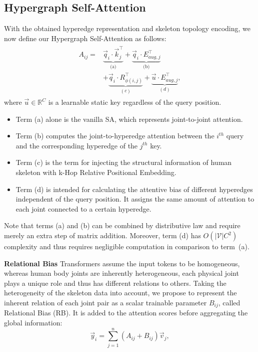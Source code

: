 \documentclass[10pt,twocolumn,letterpaper]{article}
\begin{document}
\subsection{Hypergraph Self-Attention}
With the obtained hyperedge representation and skeleton topology encoding, we now define our Hypergraph Self-Attention as follows:
\begin{align}
\label{eq:6}
\begin{split}
     A_{ij} = & \underbrace{\vec{q}_i \cdot \vec{k}_j^\top}_{\text{(a)}} + \underbrace{\vec{q}_i \cdot E_{aug, j}^\top}_{\text{(b)}} \\
     & + \underbrace{\vec{q}_i \cdot R_{\phi(i, j)}^\top}_{(c)} + \underbrace{\vec{u} \cdot E_{aug, j}^\top}_{(d)},
    \end{split}
\end{align}
where $\vec{u} \in \mathbb{R}^{C} $ is a learnable static key regardless of the query position. 
\begin{itemize}
    \item Term (a) alone is the vanilla SA, which represents joint-to-joint attention.
    \item Term (b) computes the joint-to-hyperedge attention between the $i^{th}$ query and the corresponding hyperedge of the $j^{th}$ key.
    \item Term (c) is the term for injecting the structural information of human skeleton with k-Hop Relative Positional Embedding. 
    \item Term (d) is intended for calculating the attentive bias of different hyperedges independent of the query position. It assigns the same amount of attention to each joint connected to a certain hyperedge.
\end{itemize}

Note that terms (a) and (b) can be combined by distributive law and require merely an extra step of matrix addition. Moreover, term (d) has $O(\vert \mathcal{V} \vert C^2)$ complexity and thus requires negligible computation in comparison to term~(a).

\noindent \textbf{Relational Bias}
Transformers assume the input tokens to be homogeneous, whereas human body joints are inherently heterogeneous, \eg each physical joint plays a unique role and thus has different relations to others.
Taking the heterogeneity of the skeleton data into account, we propose to represent the inherent relation of each joint pair as a scalar trainable parameter $B_{ij}$, called Relational Bias (RB).  It is added to the attention scores before aggregating the global information:
\begin{equation}
\label{eq:7}
\vec{y}_i = \sum_{j=1}^n (A_{ij} + B_{ij}) \vec{v}_j
,
\end{equation}
\end{document}
